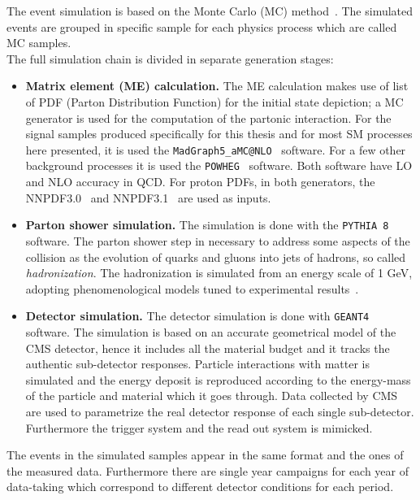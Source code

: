 The event simulation is based on the Monte Carlo (MC)
method~\cite{mc}. The simulated events
 are grouped in specific
sample for each physics process which are called MC samples.\\
The full simulation chain is divided in separate generation stages:
\begin{itemize}
\setlength\itemsep{-0.1em}
\item \textbf{Matrix element (ME) calculation.} The ME calculation
  makes use of list of PDF (Parton Distribution Function) for the initial state
  depiction; a MC generator is used for the computation of the
  partonic interaction.
 For the signal samples produced specifically for this thesis and for
  most SM processes here presented, it is used the \texttt{MadGraph5\_aMC@NLO}~\cite{Alwall_2014}
  software. For a few other background processes it
  is used the \texttt{POWHEG}~\cite{Alioli_2010} software. Both
  software have LO and NLO accuracy in QCD. For proton PDFs, in both
  generators, the NNPDF3.0~\cite{Ball_2015} and NNPDF3.1~\cite{Ball_2017} are used as inputs.
\item \textbf{Parton shower simulation.} The simulation is done with
  the \texttt{PYTHIA 8}~\cite{Sj_strand_2008, Sj_strand_2015}
  software. The parton shower step in necessary to address some aspects
  of the collision as the evolution of quarks and gluons into jets of
  hadrons, so called \emph{hadronization}. The hadronization is simulated from
  an energy scale of 1 GeV, adopting phenomenological models tuned to
  experimental results~\cite{Skands_2014, Khachatryan_2016_ps, Sirunyan_2020_ps}.
\item \textbf{Detector simulation.} The detector simulation is done
  with \texttt{GEANT4}~\cite{AGOSTINELLI2003250} software. The
  simulation is based on an accurate geometrical model of the CMS
  detector, hence it includes all the material budget and it tracks
  the authentic sub-detector responses. Particle interactions with
  matter is simulated and the energy deposit is reproduced according to the
  energy-mass of the particle and material which it goes through. Data collected by CMS are used to
  parametrize the real detector response of each single
  sub-detector. Furthermore the trigger system and the read out system
  is mimicked. 
\end{itemize}

The events in the simulated samples appear in the same format and the
ones of the measured data. Furthermore there are single year campaigns for
each year of data-taking which correspond to different detector
conditions for each period. 
 

